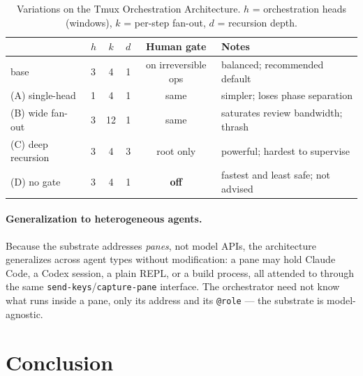 \documentclass[10pt]{article}
\newcommand{\code}[1]{\texttt{\small #1}}
\begin{document}
\begin{table}[t]
\centering
\caption{Variations on the Tmux Orchestration Architecture. $h$ = orchestration heads
(windows), $k$ = per-step fan-out, $d$ = recursion depth.}
\label{tab:var}
\vspace{0.4em}
\begin{tabular}{@{}llcccl@{}}
\toprule
 & $h$ & $k$ & $d$ & \textbf{Human gate} & \textbf{Notes}\\
\midrule
base            & 3 & 4  & 1 & on irreversible ops & balanced; recommended default \\
(A) single-head & 1 & 4  & 1 & same                & simpler; loses phase separation \\
(B) wide fan-out& 3 & 12 & 1 & same                & saturates review bandwidth; thrash \\
(C) deep recursion & 3 & 4 & 3 & root only         & powerful; hardest to supervise \\
(D) no gate     & 3 & 4  & 1 & \textbf{off}        & fastest and least safe; not advised \\
\bottomrule
\end{tabular}
\end{table}

\paragraph{Generalization to heterogeneous agents.} Because the substrate addresses
\emph{panes}, not model APIs, the architecture generalizes across agent types without
modification: a pane may hold Claude Code, a Codex session, a plain REPL, or a build
process, all attended to through the same \code{send-keys}/\code{capture-pane}
interface. The orchestrator need not know what runs inside a pane, only its address and
its \code{@role} --- the substrate is model-agnostic.

\section{Conclusion}
\end{document}
